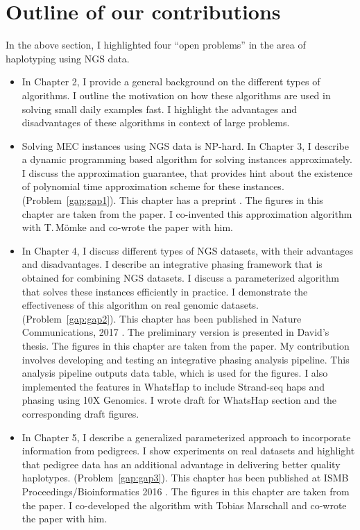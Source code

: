 \section{Outline of our contributions}
In the above section, I highlighted four ``open problems'' in the area of haplotyping using NGS data.

\begin{itemize}
 \item In Chapter 2, I provide a general background on the different types of algorithms. I outline the motivation on how these algorithms are used in solving small daily examples fast. 
 I highlight the advantages and disadvantages of these algorithms in context of large problems.
 \item Solving MEC instances using NGS data is NP-hard. In Chapter 3, I describe a dynamic programming based algorithm for solving \GMEC instances approximately.
 I discuss the approximation guarantee, that provides hint about the existence of polynomial time approximation scheme for these instances. (Problem~\ref{gap:gap1}).
 This chapter has a preprint \citep{garg2018qptas}. The figures in this chapter are taken from the paper. I co-invented this approximation algorithm with T.\,Mömke and co-wrote the paper with him.
  \item In Chapter 4, I discuss different types of NGS datasets, with their advantages and disadvantages. I describe an integrative phasing framework that is obtained for combining NGS datasets. I discuss a parameterized algorithm that solves these instances efficiently in practice. 
  I demonstrate the effectiveness of this algorithm on real genomic datasets. (Problem~\ref{gap:gap2}).
 This chapter has been published in Nature Communications, 2017 \citep{porubsky2017dense}. The preliminary version is presented in David's thesis. The figures in this chapter are taken from the paper. 
 My contribution involves developing and testing an integrative phasing analysis pipeline. This analysis pipeline outputs data table, which is used for the figures.
 I also implemented the features in WhatsHap to include Strand-seq haps and phasing using 10X Genomics.
 I wrote draft for WhatsHap section and the corresponding draft figures. 
 \item In Chapter 5, I describe a generalized parameterized approach to incorporate information from pedigrees. I show experiments on real datasets and highlight that pedigree data has an additional advantage in delivering better quality haplotypes. (Problem~\ref{gap:gap3}).
 This chapter has been published at ISMB Proceedings/Bioinformatics 2016 \citep{garg2016read}. The figures in this chapter are taken from the paper. I co-developed the algorithm with Tobias Marschall and co-wrote the paper with him.

\end{itemize}
